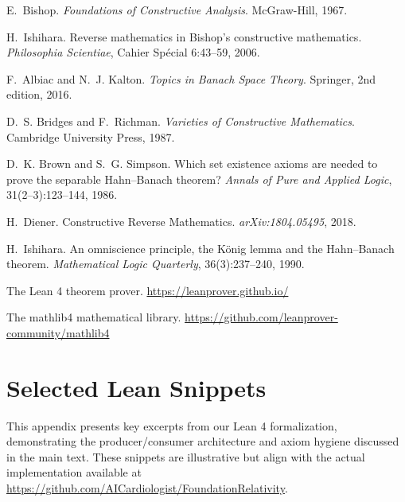 \documentclass[11pt]{article}
\newcommand{\leanRepo}{\url{https://github.com/AICardiologist/FoundationRelativity}}
\begin{document}

\begin{thebibliography}{10}

E.~Bishop.
\newblock \emph{Foundations of Constructive Analysis}.
\newblock McGraw-Hill, 1967.

H.~Ishihara.
\newblock Reverse mathematics in Bishop's constructive mathematics.
\newblock \emph{Philosophia Scientiae}, Cahier Sp\'ecial 6:43--59, 2006.

F.~Albiac and N.~J. Kalton.
\newblock \emph{Topics in Banach Space Theory}.
\newblock Springer, 2nd edition, 2016.

D.~S. Bridges and F.~Richman.
\newblock \emph{Varieties of Constructive Mathematics}.
\newblock Cambridge University Press, 1987.

D.~K. Brown and S.~G. Simpson.
\newblock Which set existence axioms are needed to prove the separable Hahn--Banach theorem?
\newblock \emph{Annals of Pure and Applied Logic}, 31(2--3):123--144, 1986.

H.~Diener.
\newblock Constructive Reverse Mathematics.
\newblock \emph{arXiv:1804.05495}, 2018.

H.~Ishihara.
\newblock An omniscience principle, the K\"onig lemma and the Hahn--Banach theorem.
\newblock \emph{Mathematical Logic Quarterly}, 36(3):237--240, 1990.

The Lean 4 theorem prover.
\newblock \url{https://leanprover.github.io/}

The mathlib4 mathematical library.
\newblock \url{https://github.com/leanprover-community/mathlib4}

\end{thebibliography}


\appendix

\section{Selected Lean Snippets}

This appendix presents key excerpts from our Lean 4 formalization, demonstrating the producer/consumer architecture and axiom hygiene discussed in the main text. These snippets are illustrative but align with the actual implementation available at \leanRepo.
\end{document}
